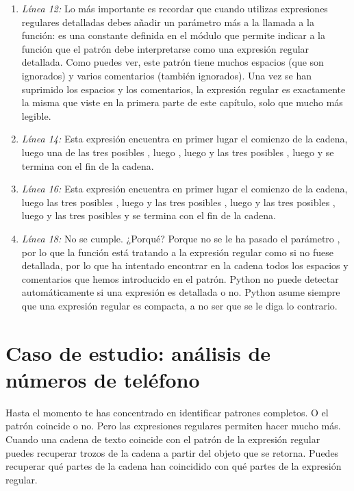 \begin{enumerate}

\item \emph{Línea 12:} Lo más importante es recordar que cuando utilizas expresiones regulares detalladas debes añadir un parámetro más a la llamada a la función:  es una constante definida en el módulo  que permite indicar a la función que el patrón debe interpretarse como una expresión regular detallada. Como puedes ver, este patrón tiene muchos espacios (que son ignorados) y varios comentarios (también ignorados). Una vez se han suprimido los espacios y los comentarios, la expresión regular es exactamente la misma que viste en la primera parte de este capítulo, solo que mucho más legible.

\item \emph{Línea 14:} Esta expresión encuentra en primer lugar el comienzo de la cadena, luego una de las tres posibles , luego , luego  y las tres posibles , luego  y se termina con el fin de la cadena.

\item \emph{Línea 16:} Esta expresión encuentra en primer lugar el comienzo de la cadena, luego las tres posibles , luego  y las tres posibles , luego  y las tres posibles , luego  y las tres posibles  y se termina con el fin de la cadena.

\item \emph{Línea 18:} No se cumple. ¿Porqué? Porque no se le ha pasado el parámetro , por lo que la función  está tratando a la expresión regular como si no fuese detallada, por lo que ha intentado encontrar en la cadena  todos los espacios y comentarios que hemos introducido en el patrón. Python no puede detectar automáticamente si una expresión es detallada o no. Python asume siempre que una expresión regular es compacta, a no ser que se le diga lo contrario.

\end{enumerate}

\section{Caso de estudio: análisis de números de teléfono}

Hasta el momento te has concentrado en identificar patrones completos. O el patrón coincide o no. Pero las expresiones regulares permiten hacer mucho más. Cuando una cadena de texto coincide con el patrón de la expresión regular puedes recuperar trozos de la cadena a partir del objeto que se retorna. Puedes recuperar qué partes de la cadena han coincidido con qué partes de la expresión regular.

